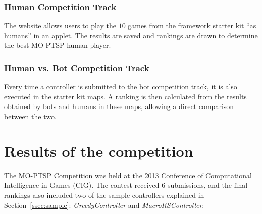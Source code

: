 \documentclass[conference]{IEEEtran}
\begin{document}
\subsubsection{Human Competition Track} The website allows users to play the $10$ games from the framework starter kit ``as humans'' in an applet. The results are saved and rankings are drawn to determine the best MO-PTSP human player.

\subsubsection{Human vs. Bot Competition Track} Every time a controller is submitted to the bot competition track, it is also executed in the starter kit maps. A ranking is then calculated from the results obtained by bots and humans in these maps, allowing a direct comparison between the two.

\section{Results of the competition} \label{sec:res}

The MO-PTSP Competition was held at the 2013 Conference of Computational Intelligence in Games (CIG). The contest received $6$ submissions, and the final rankings also included two of the sample controllers explained in Section~\ref{ssec:sample}: \textit{GreedyController} and \textit{MacroRSController}.
\end{document}
